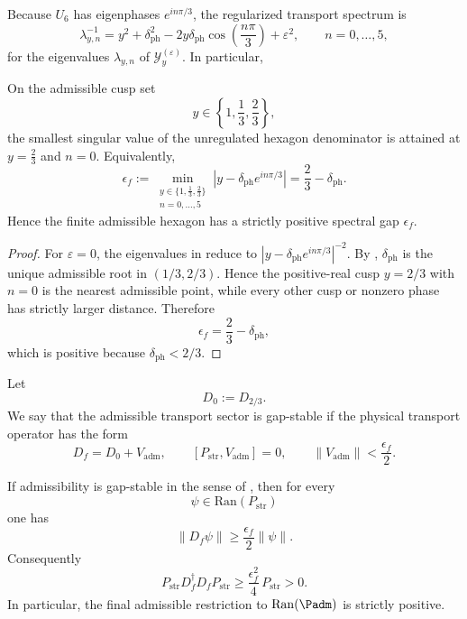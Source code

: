 
Because $U_6$ has eigenphases $e^{in\pi/3}$, the regularized transport spectrum is
\begin{equation}
\label{eq:transport-spectrum}
\lambda_{y,n}^{-1}
=
y^2+\delta_{\mathrm{ph}}^2-2y\delta_{\mathrm{ph}}\cos\!\left(\frac{n\pi}{3}\right)+\varepsilon^2,
\qquad
n=0,\dots,5,
\end{equation}
for the eigenvalues $\lambda_{y,n}$ of $\mathcal Y_y^{(\varepsilon)}$. In particular,
\begin{lemma}
\label{lem:finite-admissible-hexagon-gap}
On the admissible cusp set
\[
y\in\left\{1,\frac13,\frac23\right\},
\]
the smallest singular value of the unregulated hexagon denominator is attained at $y=\frac23$ and $n=0$. Equivalently,
\[
\epsilon_f
:=
\min_{\substack{y\in\{1,\frac13,\frac23\}\\ n=0,\dots,5}}
\left|y-\delta_{\mathrm{ph}}e^{in\pi/3}\right|
=
\frac23-\delta_{\mathrm{ph}}.
\]
Hence the finite admissible hexagon has a strictly positive spectral gap $\epsilon_f$.
\end{lemma}

\begin{proof}
For $\varepsilon=0$, the eigenvalues in  reduce to
$|y-\delta_{\mathrm{ph}}e^{in\pi/3}|^{-2}$. By ,
$\delta_{\mathrm{ph}}$ is the unique admissible root in $(1/3,2/3)$. Hence the positive-real cusp
$y=2/3$ with $n=0$ is the nearest admissible point, while every other cusp or nonzero phase has
strictly larger distance. Therefore
\[
\epsilon_f=\frac23-\delta_{\mathrm{ph}},
\]
which is positive because $\delta_{\mathrm{ph}}<2/3$.
\end{proof}

\begin{definition}
\label{def:gap-stable-admissibility}
Let
\[
D_0:=D_{2/3}.
\]
We say that the admissible transport sector is gap-stable if the physical transport operator has the form
\[
D_f=D_0+V_{\mathrm{adm}},
\qquad
[P_{\mathrm{str}},V_{\mathrm{adm}}]=0,
\qquad
\|V_{\mathrm{adm}}\|<\frac{\epsilon_f}{2}.
\]
\end{definition}

\begin{proposition}
\label{prop:gap-lift-full-operator}
If admissibility is gap-stable in the sense of , then for every
\[
\psi\in\mathrm{Ran}(P_{\mathrm{str}})
\]
one has
\[
\|D_f\psi\|
\ge
\frac{\epsilon_f}{2}\|\psi\|.
\]
Consequently
\begin{equation}
\label{eq:gap-lift-full-operator}
P_{\mathrm{str}} D_f^\dagger D_f P_{\mathrm{str}}
\ge
\frac{\epsilon_f^2}{4}\,P_{\mathrm{str}}
>
0.
\end{equation}
In particular, the final admissible restriction to $\mathrm{Ran}(\Padm)$ is strictly positive.
\end{proposition}

